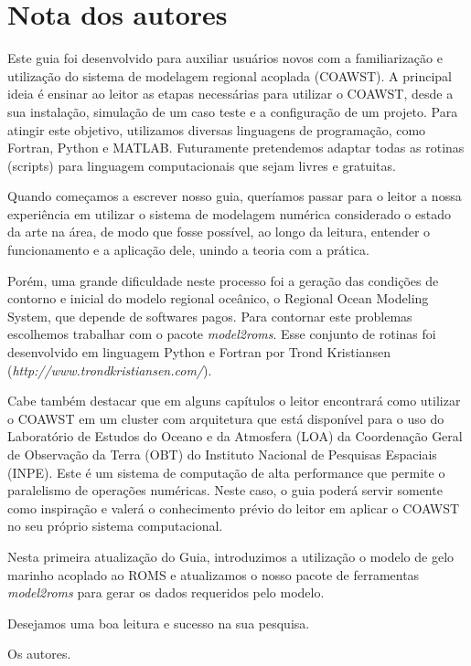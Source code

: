 \chapter*{Nota dos autores}

\noindent Este guia foi desenvolvido para auxiliar usuários novos com a familiarização e utilização do sistema de modelagem regional acoplada (COAWST). A principal ideia é ensinar ao leitor as etapas necessárias para utilizar o COAWST, desde a sua instalação, simulação de um caso teste e a configuração de um projeto. Para atingir este objetivo, utilizamos diversas linguagens de programação, como Fortran, Python e MATLAB. Futuramente pretendemos adaptar todas as rotinas (scripts) para linguagem computacionais que sejam livres e gratuitas.
\bigskip

\noindent Quando começamos a escrever nosso guia, queríamos passar para o leitor a nossa experiência em utilizar o sistema de modelagem numérica considerado o estado da arte na área, de modo que fosse possível, ao longo da leitura, entender o funcionamento e a aplicação dele, unindo a teoria com a prática.
\bigskip

\noindent Porém, uma grande dificuldade neste processo foi a geração das condições de contorno e inicial do modelo regional oceânico, o Regional Ocean Modeling System, que depende de softwares pagos. Para contornar este problemas escolhemos trabalhar com o pacote \textit{model2roms}. Esse conjunto de rotinas foi desenvolvido em linguagem Python e Fortran por Trond Kristiansen (\textcolor{bleu_cite}{\textit{http://www.trondkristiansen.com/}}).
\bigskip

\noindent Cabe também destacar que em alguns capítulos o leitor encontrará como utilizar o COAWST em um cluster com arquitetura que está disponível para o uso do Laboratório de Estudos do Oceano e da Atmosfera (LOA) da Coordenação Geral de Observação da Terra (OBT) do Instituto Nacional de Pesquisas Espaciais (INPE). Este é um sistema de computação de alta performance que permite o paralelismo de operações numéricas. Neste caso, o guia poderá servir somente como inspiração e valerá o conhecimento prévio do leitor em aplicar o COAWST no seu próprio sistema computacional.
\bigskip

\noindent Nesta primeira atualização do Guia, introduzimos a utilização o modelo de gelo marinho acoplado ao ROMS e atualizamos o nosso pacote de ferramentas \textit{model2roms} para gerar os dados requeridos pelo modelo.
\bigskip

\noindent Desejamos uma boa leitura e sucesso na sua pesquisa.
\begin{flushright}
\noindent Os autores.
\end{flushright}
